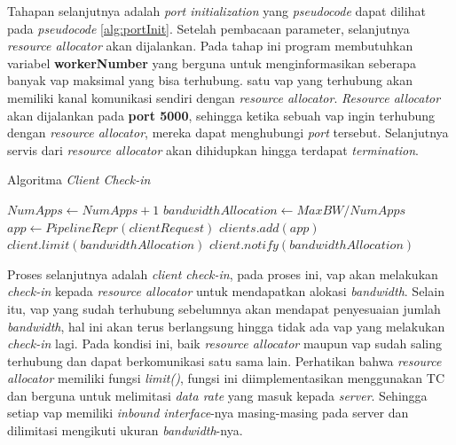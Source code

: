         Tahapan selanjutnya adalah \textit{port initialization} yang \textit{pseudocode} dapat dilihat pada \textit{pseudocode} \ref{alg:portInit}. Setelah pembacaan parameter, selanjutnya 
        \textit{resource allocator} akan dijalankan. Pada tahap ini program membutuhkan variabel \textbf{workerNumber} yang berguna untuk menginformasikan seberapa banyak \gls{vap} maksimal yang bisa terhubung.
        satu \gls{vap} yang terhubung akan memiliki kanal komunikasi sendiri dengan \textit{resource allocator}. \textit{Resource allocator} akan dijalankan pada \textbf{port 5000}, sehingga ketika 
        sebuah \gls{vap} ingin terhubung dengan \textit{resource allocator}, mereka dapat menghubungi \textit{port} tersebut. Selanjutnya servis dari \textit{resource allocator} akan dihidupkan hingga terdapat \textit{termination}.

        \begin{algorithm}[tbh]
        \caption{Algoritma \textit{Client Check-in}}\label{alg:appCheckin}
        \begin{algorithmic}[1]
        \State $NumApps \gets NumApps + 1$
        \State $bandwidthAllocation \gets MaxBW/NumApps$ 
        \State $app \gets PipelineRepr(clientRequest)$
        \State $clients.add(app)$
        \State $client.limit(bandwidthAllocation)$
        \State $client.notify(bandwidthAllocation)$
        \EndFor
        \EndProcedure
        \end{algorithmic}
        \end{algorithm}

        Proses selanjutnya adalah \textit{client check-in}, pada proses ini, \gls{vap} akan melakukan \textit{check-in} kepada \textit{resource allocator} untuk mendapatkan alokasi \textit{bandwidth}. Selain itu, \gls{vap}
        yang sudah terhubung sebelumnya akan mendapat penyesuaian jumlah \textit{bandwidth}, hal ini akan terus berlangsung hingga tidak ada \gls{vap} yang melakukan \textit{check-in} lagi.
        Pada kondisi ini, baik \textit{resource allocator} maupun \gls{vap} sudah saling terhubung dan dapat berkomunikasi satu sama lain. Perhatikan bahwa \textit{resource allocator} memiliki fungsi \textit{limit()}, fungsi 
        ini diimplementasikan menggunakan TC dan berguna untuk melimitasi \textit{data rate} yang masuk kepada \textit{server}. Sehingga setiap \gls{vap} memiliki \textit{inbound interface}-nya masing-masing pada server dan dilimitasi mengikuti ukuran \textit{bandwidth}-nya.

